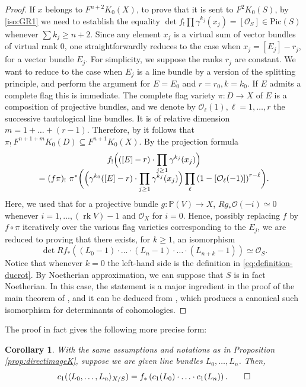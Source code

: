 \documentclass[JEP,XML,SOM,Unicode,published]{cedram}
\theoremstyle{plain}
\newtheorem{corollary}[theorem]{Corollary}
\theoremstyle{definition}
\newcommand{\PBbb}{\mathbb P}
\newcommand{\Ocal}{\mathcal O}
\newcommand{\Pic}{\mathrm{Pic}}
\DeclareMathOperator{\rk}{rk}
\begin{document}
\begin{proof}
If $x$ belongs to $F^{n+2}K_{0}(X)$, to prove that it is sent to $F^{2}K_{0}(S)$, by \eqref{iso:GR1} we need to establish the equality $\det f_!\prod \gamma^{k_j}(x_j)\!=\! [\Ocal_S] \!\in\! \Pic(S)$ whenever $\sum k_j \!\geq\! n+2$. Since any element $x_j$ is a virtual sum of vector bundles of virtual rank 0, one straightforwardly reduces to the case when $x_j = [E_j]-r_j$, for a vector bundle $E_j$. For simplicity, we suppose the ranks $r_j$ are constant. We want to reduce to the case when $E_j$ is a line bundle by a version of the splitting principle, and perform the argument for $E = E_0$ and $r=r_0, k = k_0$. If $E$ admits a complete flag this is immediate. The complete flag variety $\pi: D \to X$ of $E$ is a composition of projective bundles, and we denote by $\Ocal_\ell(1), \ell = 1, \ldots, r$ the successive tautological line bundles. It is of relative dimension $m=1+\ldots+(r-1)$. Therefore, by \cite[Exp.\,VI, Cor.\,5.8]{SGA6} it follows that $\pi_!\ F^{n+1+m} K_0(D) \subseteq F^{n+1}K_0(X)$. By the projection formula\vspace*{-3pt}
\begin{multline*}
f_! \Bigl(([E]-r) \cdot \prod_{j\geq 1} \gamma^{k_j}(x_j) \Bigr)\\[-10pt]
= ( f \pi)_!\ \pi^{\ast} \biggl(\Bigl(\gamma^{k_0}([E]-r) \cdot \prod_{j \geq 1} \gamma^{k_j}(x_j) \Bigr) \prod_\ell \left(1-[\Ocal_\ell(-1)]\right)^{r-\ell}\biggr).
\end{multline*}
Here, we used that for a projective bundle $g \colon \PBbb(V)\to X$, $Rg_\ast \Ocal(-i) \simeq 0$ whenever $i = 1, \ldots, (\rk V)-1$ and $\Ocal_X$ for $i = 0$. Hence, possibly replacing $f$ by $ f \circ \pi$ iteratively over the various flag varieties corresponding to the $E_j$, we are reduced to proving that there exists, for $k \geq 1$, an isomorphism
\begin{displaymath}
\det Rf_{\ast} \left( (L_0 -1)\cdot \ldots \cdot (L_n -1) \cdot \ldots \cdot (L_{n+k} -1)\right) \simeq \Ocal_S.
\end{displaymath}
Notice that whenever $k =0$ the left-hand side is the definition in \eqref{eq:definition-ducrot}. By Noetherian approximation, we can suppose that $S$ is in fact Noetherian. In this case, the statement is a major ingredient in the proof of the main theorem of \cite{Ducrot}, and it can be deduced from \cite[Prop.\,4.7.1]{Ducrot}, which produces a canonical such isomorphism for determinants of cohomologies.
\end{proof}
The proof in fact gives the following more precise form:
\begin{corollary}\label{cor:deligne-pairing-direct-image}
With the same assumptions and notations as in Proposition \ref{prop:directimageK}, suppose we are given line bundles $L_0, \ldots, L_n$. Then,
\begin{displaymath}
c_1(\langle L_0, \ldots, L_n \rangle_{X/S} )=f_\ast \left(c_{1}(L_0)\cdot \ldots\cdot c_{1}(L_n)\right).\qed
\end{displaymath}
\end{corollary}
\end{document}
